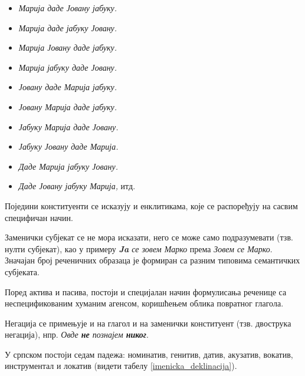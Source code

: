 {\begin{multicols}{2}
\begin{itemize}
 \item \textit{Марија даде Јовану јабуку.}
 \item \textit{Марија даде јабуку Јовану.} 
 \item \textit{Марија Јовану даде јабуку.} 
 \item \textit{Марија јабуку даде Јовану.}
 \item \textit{Јовану даде Марија јабуку.}
 \item \textit{Јовану Марија даде јабуку.}
 \item \textit{Јабуку Марија даде Јовану.}
 \item \textit{Јабуку Јовану даде Марија.}
 \item \textit{Даде Марија јабуку Јовану.} 
 \item \textit{Даде Јовану јабуку Марија,} итд.
\end{itemize}
Поједини конституенти се исказују и енклитикама, које се распоређују на сасвим специфичан начин.

Заменички субјекат се не мора исказати, него се може само подразумевати (тзв. нулти субјекат), као у примеру \textit{\textbf{Ja} се зовем Марко} према \textit{Зовем се Марко}. Значајан број реченичних образаца је формиран са разним типовима семантичких субјеката.

Поред актива и пасива, постоји и специјалан начин формулисања реченице са неспецификованим хуманим агенсом, коришћењем облика повратног глагола.

Негација се примењује и на глагол и на заменички конституент (тзв. двострука негација), нпр. \textit{Овде \textbf{не} познајем \textbf{никог}}.

У српском постоји седам падежа: номинатив, генитив, датив, акузатив, вокатив, инструментал и локатив (видети табелу \ref{imenicka_deklinacija}). 


\end{multicols}}
